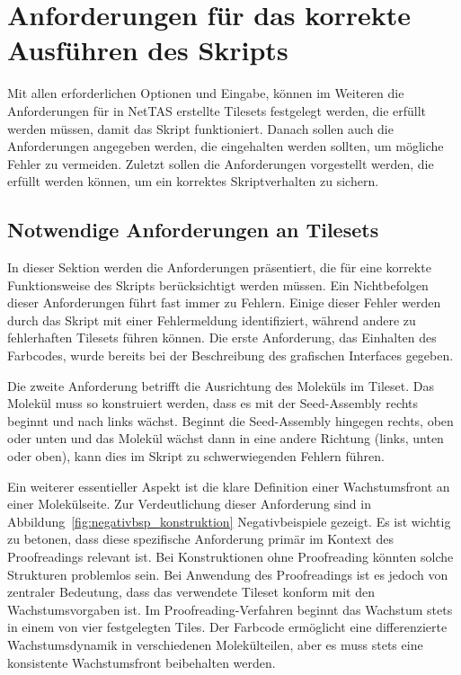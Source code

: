 \section{Anforderungen für das korrekte Ausführen des Skripts}

Mit allen erforderlichen Optionen und Eingabe, können im Weiteren die Anforderungen für in NetTAS erstellte Tilesets festgelegt werden, die erfüllt werden müssen, damit das Skript funktioniert. Danach sollen auch die Anforderungen angegeben werden, die eingehalten werden sollten, um mögliche Fehler zu vermeiden. Zuletzt sollen die Anforderungen vorgestellt werden, die erfüllt werden können, um ein korrektes Skriptverhalten zu sichern.

\subsection{Notwendige Anforderungen an Tilesets}

In dieser Sektion werden die Anforderungen präsentiert, die für eine korrekte Funktionsweise des Skripts berücksichtigt werden müssen. Ein Nichtbefolgen dieser Anforderungen führt fast immer zu Fehlern. Einige dieser Fehler werden durch das Skript mit einer Fehlermeldung identifiziert, während andere zu fehlerhaften Tilesets führen können. Die erste Anforderung, das Einhalten des Farbcodes, wurde bereits bei der Beschreibung des grafischen Interfaces gegeben.

Die zweite Anforderung betrifft die Ausrichtung des Moleküls im Tileset. Das Molekül muss so konstruiert werden, dass es mit der Seed-Assembly rechts beginnt und nach links wächst. Beginnt die Seed-Assembly hingegen rechts, oben oder unten und das Molekül wächst dann in eine andere Richtung (links, unten oder oben), kann dies im Skript zu schwerwiegenden Fehlern führen.

Ein weiterer essentieller Aspekt ist die klare Definition einer Wachstumsfront an einer Molekülseite. Zur Verdeutlichung dieser Anforderung sind in Abbildung~\ref{fig:negativbsp_konstruktion} Negativbeispiele gezeigt. Es ist wichtig zu betonen, dass diese spezifische Anforderung primär im Kontext des Proofreadings relevant ist. Bei Konstruktionen ohne Proofreading könnten solche Strukturen problemlos sein. Bei Anwendung des Proofreadings ist es jedoch von zentraler Bedeutung, dass das verwendete Tileset konform mit den Wachstumsvorgaben ist. Im Proofreading-Verfahren beginnt das Wachstum stets in einem von vier festgelegten Tiles. Der Farbcode ermöglicht eine differenzierte Wachstumsdynamik in verschiedenen Molekülteilen, aber es muss stets eine konsistente Wachstumsfront beibehalten werden.

